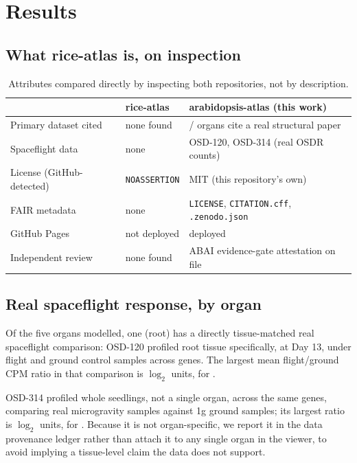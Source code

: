 \section{Results}

\subsection{What rice-atlas is, on inspection}

\begin{table}[h]
\centering
\begin{tabular}{@{}lll@{}}
\toprule
& rice-atlas & arabidopsis-atlas (this work) \\
\midrule
Primary dataset cited & none found & \NumOrgansWithGeometryCitation{}/\NumOrgansModeled{} organs cite a real structural paper \\
Spaceflight data & none & OSD-120, OSD-314 (real OSDR counts) \\
License (GitHub-detected) & \texttt{NOASSERTION} & MIT (this repository's own) \\
FAIR metadata & none & \texttt{LICENSE}, \texttt{CITATION.cff}, \texttt{.zenodo.json} \\
GitHub Pages & not deployed & deployed \\
Independent review & none found & ABAI evidence-gate attestation on file \\
\bottomrule
\end{tabular}
\caption{Attributes compared directly by inspecting both repositories, not by
description.}
\end{table}

\subsection{Real spaceflight response, by organ}

Of the five organs modelled, one (root) has a directly tissue-matched real spaceflight
comparison: OSD-120 profiled root tissue specifically, at Day 13, under
\NumFlightSamplesOsdOneTwentyZero{} flight and \NumGroundSamplesOsdOneTwentyZero{} ground
control samples across \NumGenesOsdOneTwentyZero{} genes. The largest mean flight/ground
CPM ratio in that comparison is \TopFoldChangeOsdOneTwentyZero{} $\log_2$ units, for
\texttt{\TopGeneOsdOneTwentyZero{}}.

OSD-314 profiled whole seedlings, not a single organ, across the same
\NumGenesOsdThreeFourteen{} genes, comparing \NumMicrogSamplesOsdThreeFourteen{} real
microgravity samples against \NumGroundSamplesOsdThreeFourteen{} 1g ground samples; its
largest ratio is \TopFoldChangeOsdThreeFourteen{} $\log_2$ units, for
\texttt{\TopGeneOsdThreeFourteen{}}. Because it is not organ-specific, we report it in the
data provenance ledger rather than attach it to any single organ in the viewer, to avoid
implying a tissue-level claim the data does not support.

